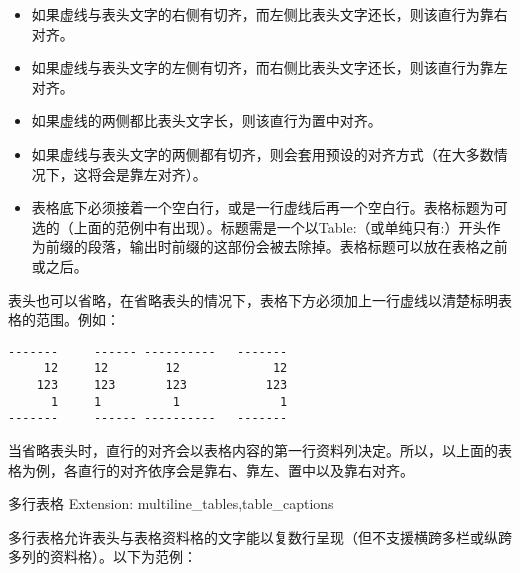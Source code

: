\documentclass[fancyhdr,bookmark]{ctexbook}
\begin{document}
\begin{itemize}
\itemsep1pt\parskip0pt
\item
  如果虚线与表头文字的右侧有切齐，而左侧比表头文字还长，则该直行为靠右对齐。
\item
  如果虚线与表头文字的左侧有切齐，而右侧比表头文字还长，则该直行为靠左对齐。
\item
  如果虚线的两侧都比表头文字长，则该直行为置中对齐。
\item
  如果虚线与表头文字的两侧都有切齐，则会套用预设的对齐方式（在大多数情况下，这将会是靠左对齐）。
\item
  表格底下必须接着一个空白行，或是一行虚线后再一个空白行。表格标题为可选的（上面的范例中有出现）。标题需是一个以Table:（或单纯只有:）开头作为前缀的段落，输出时前缀的这部份会被去除掉。表格标题可以放在表格之前或之后。
\end{itemize}

表头也可以省略，在省略表头的情况下，表格下方必须加上一行虚线以清楚标明表格的范围。例如：

\begin{lstlisting}
-------     ------ ----------   -------
     12     12        12             12
    123     123       123           123
      1     1          1              1
-------     ------ ----------   -------
\end{lstlisting}

当省略表头时，直行的对齐会以表格内容的第一行资料列决定。所以，以上面的表格为例，各直行的对齐依序会是靠右、靠左、置中以及靠右对齐。

多行表格 Extension: multiline\_tables,table\_captions

多行表格允许表头与表格资料格的文字能以复数行呈现（但不支援横跨多栏或纵跨多列的资料格）。以下为范例：
\end{document}

